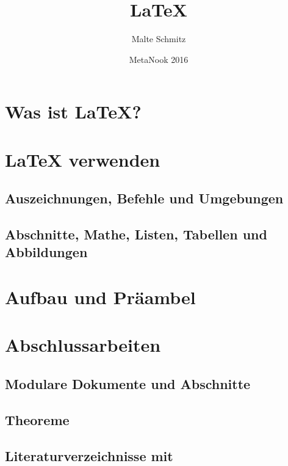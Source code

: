 \documentclass[xcolor=table]{beamer}
\author{Malte Schmitz}
\title{LaTeX}
\date{MetaNook 2016}
\begin{document}



\section{Was ist \LaTeX?}


\section{\LaTeX{} verwenden}
\subsection{Auszeichnungen, Befehle und Umgebungen}

\subsection{Abschnitte, Mathe, Listen, Tabellen und Abbildungen}

\section{Aufbau und Präambel}


\section{Abschlussarbeiten}

\subsection{Modulare Dokumente und Abschnitte}


\subsection{Theoreme}

\subsection{Literaturverzeichnisse mit \texorpdfstring{\BibTeX}{BibTeX}}



\end{document}
